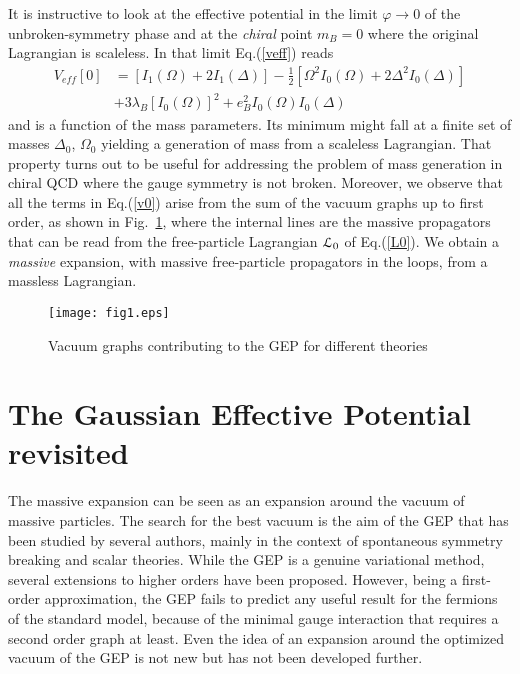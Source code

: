 \documentclass[aps,preprint]{revtex4}
\newcommand{\nn}{\nonumber}
\begin{document}
It is instructive to look at the effective potential in the limit $\varphi\to 0$
of the unbroken-symmetry phase and at the {\it chiral} point $m_B=0$ where the original
Lagrangian is scaleless. In that limit Eq.(\ref{veff}) reads
\begin{align}
V_{eff}[0]&= \left[ I_{1}(\Omega)+2I_{1}(\Delta)\right]
-\frac{1}{2}\left[\Omega^{2}I_{0}(\Omega)+2\Delta^{2} I_{0}(\Delta)\right]\nn\\
&+3\lambda_{B}\left[I_{0}(\Omega)\right]^2   
+e_B^{2}I_{0}(\Omega)I_{0}(\Delta)
\label{v0}
\end{align}
and is a function of the mass parameters. Its minimum might fall at a finite set of masses $\Delta_0$, $\Omega_0$
yielding a generation of mass from a scaleless Lagrangian. That property turns out to be useful for
addressing the problem of mass generation in chiral QCD where the gauge symmetry is not broken.
Moreover, we observe that all the terms in Eq.(\ref{v0}) arise from the sum of the vacuum graphs up to
first order, as shown in Fig.~\ref{fig1}, where the internal lines are the massive propagators that can 
be read from the free-particle Lagrangian ${\cal L}_0$ of Eq.(\ref{L0}). We obtain a {\it massive} expansion,
with massive free-particle propagators in the loops, from a massless Lagrangian.

\begin{figure}[b] 
\centering
\texttt{[image: fig1.eps]}
\caption{Vacuum graphs contributing to the GEP for different theories}
\label{fig1}
\end{figure}



\section{The Gaussian Effective Potential revisited}\label{sec3}

The massive expansion can be seen as an expansion around the
vacuum of massive particles. The search for the best vacuum is the aim of  the
GEP that has been studied by several authors, mainly in the context of spontaneous
symmetry breaking and scalar theories. While the GEP is a genuine variational method, several extensions to
higher orders have been proposed. However, being a first-order approximation, the GEP fails to predict any useful
result for the fermions of the standard model, because of the minimal gauge interaction that requires a
second order graph at least\cite{HT,gep2}. Even the idea of an expansion around the optimized vacuum of the GEP 
is not new\cite{tedesco} but has not been developed further.
\end{document}
